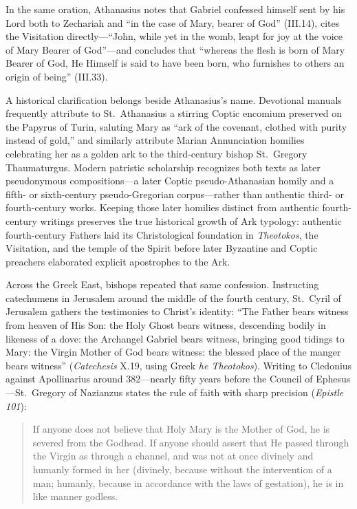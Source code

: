 In the same oration, Athanasius notes that Gabriel confessed himself sent by his Lord both to Zechariah and ``in the case of Mary, bearer of God'' (III.14), cites the Visitation directly---``John, while yet in the womb, leapt for joy at the voice of Mary Bearer of God''---and concludes that ``whereas the flesh is born of Mary Bearer of God, He Himself is said to have been born, who furnishes to others an origin of being'' (III.33).

A historical clarification belongs beside Athanasius's name. Devotional manuals frequently attribute to St.\ Athanasius a stirring Coptic encomium preserved on the Papyrus of Turin, saluting Mary as ``ark of the covenant, clothed with purity instead of gold,'' and similarly attribute Marian Annunciation homilies celebrating her as a golden ark to the third-century bishop St.\ Gregory Thaumaturgus. Modern patristic scholarship recognizes both texts as later pseudonymous compositions---a later Coptic pseudo-Athanasian homily and a fifth- or sixth-century pseudo-Gregorian corpus---rather than authentic third- or fourth-century works. Keeping those later homilies distinct from authentic fourth-century writings preserves the true historical growth of Ark typology: authentic fourth-century Fathers laid its Christological foundation in \textit{Theotokos}, the Visitation, and the temple of the Spirit before later Byzantine and Coptic preachers elaborated explicit apostrophes to the Ark.

Across the Greek East, bishops repeated that same confession. Instructing catechumens in Jerusalem around the middle of the fourth century, St.\ Cyril of Jerusalem gathers the testimonies to Christ's identity: ``The Father bears witness from heaven of His Son: the Holy Ghost bears witness, descending bodily in likeness of a dove: the Archangel Gabriel bears witness, bringing good tidings to Mary: the Virgin Mother of God bears witness: the blessed place of the manger bears witness'' (\textit{Catechesis} X.19, using Greek \textit{he Theotokos}). Writing to Cledonius against Apollinarius around 382---nearly fifty years before the Council of Ephesus---St.\ Gregory of Nazianzus states the rule of faith with sharp precision (\textit{Epistle 101}):

\begin{quote}\small
If anyone does not believe that Holy Mary is the Mother of God, he is severed from the Godhead. If anyone should assert that He passed through the Virgin as through a channel, and was not at once divinely and humanly formed in her (divinely, because without the intervention of a man; humanly, because in accordance with the laws of gestation), he is in like manner godless.
\end{quote}


